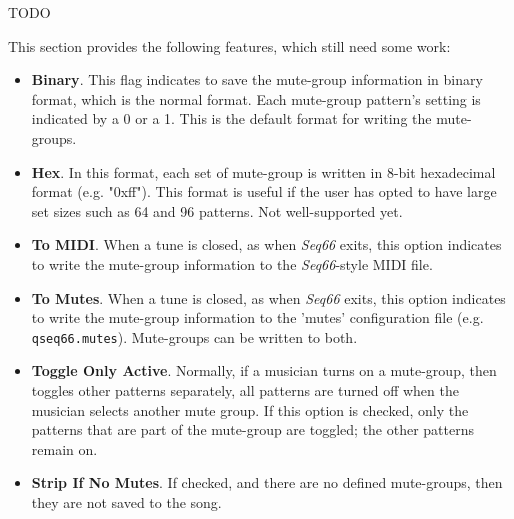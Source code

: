    TODO

   This section provides the following features, which still need some work:

      \begin{itemize}
         \itempar \textbf{From MIDI}.
            If checked, the mute-groups are read from the MIDI file, if
            present.  These mute-group override the one from an external
            'mutes' file.
         \itempar \textbf{From Mutes}.
            If checked, the mute-groups are read from the specified
            'mutes' file, if present and active.
         \item \textbf{Binary}.
            This flag indicates to save the mute-group information in
            binary format, which is the normal format.
            Each mute-group pattern's setting is indicated by a 0 or a 1.
            This is the default format for writing the mute-groups.
         \item \textbf{Hex}.
            In this format, each set of mute-group is written in 8-bit
            hexadecimal format (e.g. "0xff").  This format is useful if the
            user has opted to have large set sizes such as 64 and 96 patterns.
            Not well-supported yet.
         \item \textbf{To MIDI}.
            When a tune is closed, as when \textsl{Seq66} exits, this option
            indicates to write the mute-group information to the
            \textsl{Seq66}-style MIDI file.
         \item \textbf{To Mutes}.
            When a tune is closed, as when \textsl{Seq66} exits, this option
            indicates to write the mute-group information to the 'mutes'
            configuration file (e.g. \texttt{qseq66.mutes}).
            Mute-groups can be written to both.
         \item \textbf{Toggle Only Active}.
            Normally, if a musician turns on a mute-group, then toggles
            other patterns separately, all patterns are turned off
            when the musician selects another mute group.
            If this option is checked, only the patterns that are
            part of the mute-group are toggled; the other patterns remain
            on.
         \item \textbf{Strip If No Mutes}.
            If checked, and there are no defined mute-groups, then
            they are not saved to the song.
      \end{itemize}

